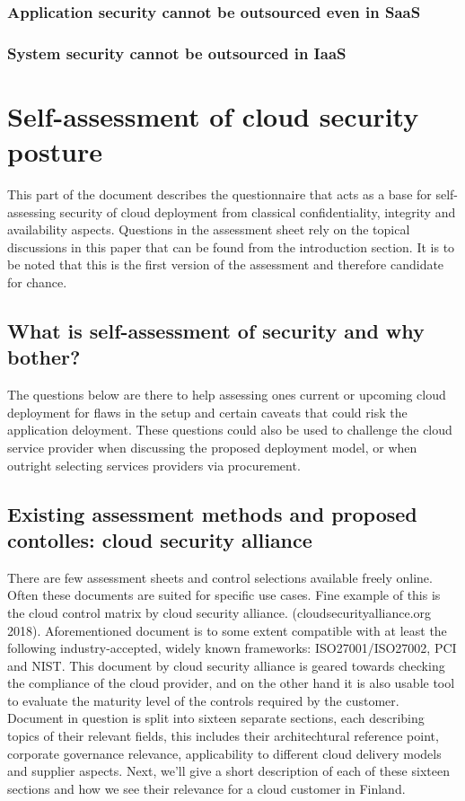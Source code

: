 \documentclass{article}
\begin{document}
\subsubsection{Application security cannot be outsourced even in SaaS}
\subsubsection{System security cannot be outsourced in IaaS}
\section{Self-assessment of cloud security posture}
This part of the document describes the questionnaire that acts as a base for self-assessing security of cloud deployment from classical confidentiality, integrity and availability aspects. Questions in the assessment sheet rely on the topical discussions in this paper that can be found from the introduction section. It is to be noted that this is the first version of the assessment and therefore candidate for chance. 
\subsection{What is self-assessment of security and why bother?}
The questions below are there to help assessing ones current or upcoming cloud deployment for flaws in the setup and certain caveats that could risk the application deloyment. These questions could also be used to challenge the cloud service provider when discussing the proposed deployment model, or when outright selecting services providers via procurement.
\subsection{Existing assessment methods and proposed contolles: cloud security alliance}
There are few assessment sheets and control selections available freely online. Often these documents are suited for specific use cases. Fine example of this is the cloud control matrix by cloud security alliance. (cloudsecurityalliance.org 2018).
Aforementioned document is to some extent compatible with at least the following industry-accepted, widely known frameworks: ISO27001/ISO27002, PCI and NIST. This document by cloud security alliance is geared towards checking the compliance of the cloud provider, and on the other hand it is also usable tool to evaluate the maturity level of the controls required by the customer.
Document in question is split into sixteen separate sections, each describing topics of their relevant fields, this includes their architechtural reference point, corporate governance relevance, applicability to different cloud delivery models and supplier aspects. Next, we'll give a short description of each of these sixteen sections and how we see their relevance for a cloud customer in Finland.
\end{document}
